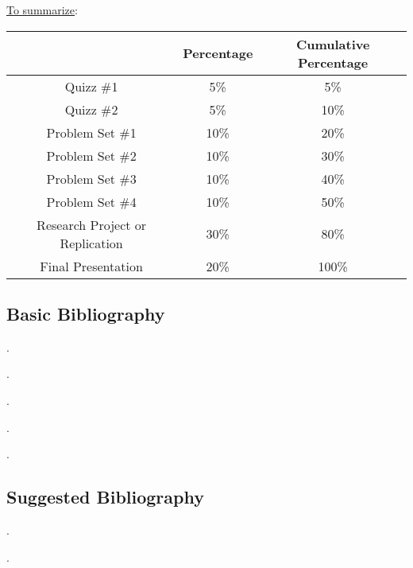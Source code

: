 \documentclass[letterpaper]{article}
\renewenvironment{itemize}{
  \begin{list}{}{
    \setlength{\leftmargin}{1.5em}
  }
}{
  \end{list}
}
\begin{document}
\begin{enumerate}
\end{enumerate}


\underline{To summarize}:

\begin{table}[H]
\centering
\begin{tabular}{ccc}
						  	& \textbf{Percentage} & {\bf Cumulative Percentage} \\
							\hline
Quizz \#1      	& 5\%       	 & 5\% \\
Quizz \#2       & 5\%         & 10\% \\
\hline
Problem Set \#1 													 & 10\% 		 & 20\%  \\
Problem Set \#2 													 & 10\% 		 & 30\%  \\
Problem Set \#3 													 & 10\% 		 & 40\%  \\
Problem Set \#4 													 & 10\% 		 & 50\%  \\
\hline
Research Project or Replication						 & 30\% 	 	 & 80\% \\
Final Presentation												 & 20\% 	 	 & 100\% \\
\hline             
\end{tabular}
\end{table}


\subsection*{Basic Bibliography}

\begin{itemize}
  \item[$\bullet$] .
  \item[$\bullet$] .
  \item[$\bullet$] .
  \item[$\bullet$] .
  \item[$\bullet$] .
  \item[$\bullet$] 

\end{itemize}

\subsection*{Suggested Bibliography}

\begin{itemize}
  \item[$\bullet$] .
  \item[$\bullet$] .
\end{itemize}
\end{document}

